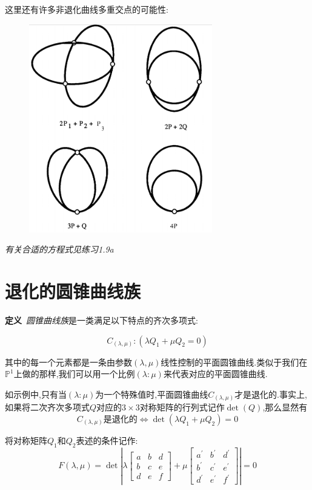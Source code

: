 \documentclass[UTF8]{book}
\begin{document}
		
		这里还有许多非退化曲线多重交点的可能性:
		\begin{figure}[H]
		  \centering
		  \includegraphics[width=8cm]{21.jpg}
		\end{figure}
	
	
		\textit{有关合适的方程式见练习1.9a}
		
		\section{退化的圆锥曲线族}
		\textbf{定义}\ \textit{圆锥曲线族}是一类满足以下特点的齐次多项式:
		
		\begin{equation*}
		C_{(\lambda, \mu)} :\left(\lambda Q_{1}+\mu Q_{2}=0\right)
		\end{equation*}
		
		其中的每一个元素都是一条由参数$(\lambda, \mu)$线性控制的平面圆锥曲线.类似于我们在$\mathbb{P}^{1}$上做的那样,我们可以用一个比例$(\lambda : \mu)$来代表对应的平面圆锥曲线.
		
		
		如示例中,只有当$(\lambda : \mu)$为一个特殊值时,平面圆锥曲线$C_{(\lambda, \mu)}$才是退化的.事实上,如果将二次齐次多项式$Q$对应的$3 \times 3$对称矩阵的行列式记作$\operatorname{det}(Q)$,那么显然有
		\begin{equation*}
		C_{(\lambda, \mu)} \text {是退化的} \Longleftrightarrow \operatorname{det}\left(\lambda Q_{1}+\mu Q_{2}\right)=0
		\end{equation*}
		
		
		将对称矩阵$Q_{1}$和$Q_{2}$表述的条件记作:
		\begin{equation*}
		F(\lambda, \mu)=\operatorname{det}\left|\lambda\left[\begin{array}{ccc}{a} & {b} & {d} \\ {b} & {c} & {e} \\ {d} & {e} & {f}\end{array}\right]+\mu\left[\begin{array}{ccc}{a^{\prime}} & {b^{\prime}} & {d^{\prime}} \\ {b^{\prime}} & {c^{\prime}} & {e^{\prime}} \\ {d^{\prime}} & {e^{\prime}} & {f^{\prime}}\end{array}\right]\right|=0
		\end{equation*}
		
\end{document}
